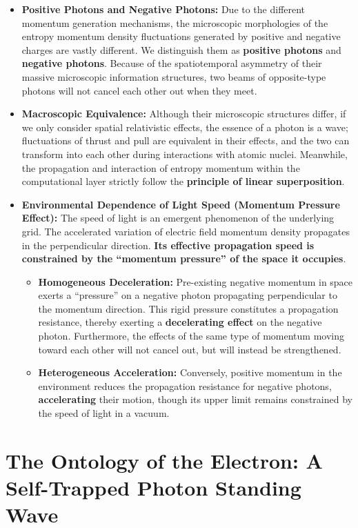 \documentclass[12pt, a4paper]{article}
\begin{document}
\begin{itemize}
    \item \textbf{Positive Photons and Negative Photons:} Due to the different momentum generation mechanisms, the microscopic morphologies of the entropy momentum density fluctuations generated by positive and negative charges are vastly different. We distinguish them as \textbf{positive photons} and \textbf{negative photons}. Because of the spatiotemporal asymmetry of their massive microscopic information structures, two beams of opposite-type photons will not cancel each other out when they meet.
    \item \textbf{Macroscopic Equivalence:} Although their microscopic structures differ, if we only consider spatial relativistic effects, the essence of a photon is a wave; fluctuations of thrust and pull are equivalent in their effects, and the two can transform into each other during interactions with atomic nuclei. Meanwhile, the propagation and interaction of entropy momentum within the computational layer strictly follow the \textbf{principle of linear superposition}.
    \item \textbf{Environmental Dependence of Light Speed (Momentum Pressure Effect):} The speed of light is an emergent phenomenon of the underlying grid. The accelerated variation of electric field momentum density propagates in the perpendicular direction. \textbf{Its effective propagation speed is constrained by the ``momentum pressure'' of the space it occupies}.
    \begin{itemize}
        \item \textbf{Homogeneous Deceleration:} Pre-existing negative momentum in space exerts a ``pressure'' on a negative photon propagating perpendicular to the momentum direction. This rigid pressure constitutes a propagation resistance, thereby exerting a \textbf{decelerating effect} on the negative photon. Furthermore, the effects of the same type of momentum moving toward each other will not cancel out, but will instead be strengthened.
        \item \textbf{Heterogeneous Acceleration:} Conversely, positive momentum in the environment reduces the propagation resistance for negative photons, \textbf{accelerating} their motion, though its upper limit remains constrained by the speed of light in a vacuum.
    \end{itemize}
\end{itemize}

\section{The Ontology of the Electron: A Self-Trapped Photon Standing Wave}
\end{document}
